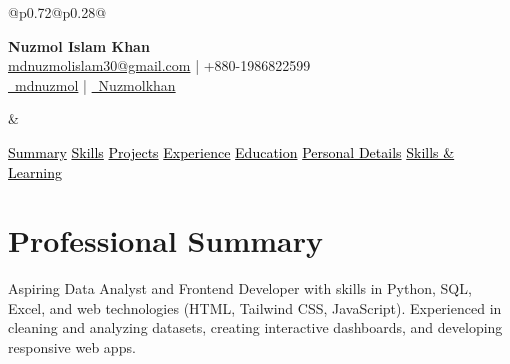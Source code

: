 \documentclass[a4paper,10pt]{article}
\newcommand{\buttonlink}[2]{%
  \colorbox{gray!20}{\hyperref[#1]{\textcolor{black}{#2}}}%
}
\newcommand{\cvsection}[2]{%
  \section*{\textcolor{blue!50!black}{#1}}\label{#2}%
  \vspace{4pt}%
}
\begin{document}
\begin{tabular}{@{}p{0.72\textwidth}@{}p{0.28\textwidth}@{}}
\begin{minipage}[c]{\linewidth}
    {\LARGE \textbf{Nuzmol Islam Khan}} \\[4pt]
    \href{mailto:mdnuzmolislam30@gmail.com}{mdnuzmolislam30@gmail.com} \; | \; +880-1986822599 \\
    \href{https://www.linkedin.com/in/mdnuzmol}{\faLinkedin\ mdnuzmol} \; | \;
    \href{https://github.com/Nuzmolkhan}{\faGithub\ Nuzmolkhan}
\end{minipage} &
\begin{minipage}[c]{\linewidth}
    \raggedleft
\end{minipage}
\end{tabular}

\vspace{8pt}

\noindent
\buttonlink{sec:summary}{Summary} \hspace{3pt}
\buttonlink{sec:skills}{Skills} \hspace{3pt}
\buttonlink{sec:projects}{Projects} \hspace{3pt}
\buttonlink{sec:experience}{Experience} \hspace{3pt}
\buttonlink{sec:education}{Education} \hspace{3pt}
\buttonlink{sec:personal}{Personal Details} \hspace{3pt}
\buttonlink{sec:learning}{Skills \& Learning}

\vspace{8pt}

\cvsection{Professional Summary}{sec:summary}
Aspiring Data Analyst and Frontend Developer with skills in Python, SQL, Excel, and web technologies (HTML, Tailwind CSS, JavaScript). Experienced in cleaning and analyzing datasets, creating interactive dashboards, and developing responsive web apps.
\end{document}
